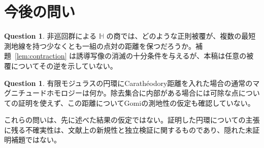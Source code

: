 \documentclass[12pt]{amsart}
\theoremstyle{definition}
\newtheorem{ques}[thm]{Question}
\theoremstyle{remark}
\numberwithin{equation}{section}
\begin{document}
\section{今後の問い}\label{sec:questions}
\begin{ques}\label{ques:cover}
非巡回群による $\mathbb H$ の商では、どのような正則被覆が、複数の最短測地線を持つ少なくとも一組の点対の距離を保つだろうか。補題~\ref{lem:contraction} は誘導写像の消滅の十分条件を与えるが、本稿は任意の被覆についてその逆を示していない。
\end{ques}
\begin{ques}\label{ques:caratheodory}
有限モジュラスの円環にCarath\'eodory距離を入れた場合の通常のマグニチュードホモロジーは何か。除去集合に内部がある場合には可除な点についての証明を使えず、この距離についてGomiの測地性の仮定も確認していない。
\end{ques}
これらの問いは、先に述べた結果の仮定ではない。証明した円環についての主張に残る不確実性は、文献上の新規性と独立検証に関するものであり、隠れた未証明補題ではない。
\end{document}
